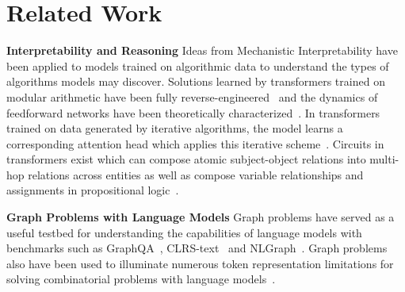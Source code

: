 \section{Related Work}
\vspace{-0.05in}
{\bf Interpretability and Reasoning}
Ideas from Mechanistic Interpretability have been applied to models trained on algorithmic data to understand the types of algorithms models may discover. Solutions learned by transformers trained on modular arithmetic have been fully reverse-engineered~\cite{nanda2023} and the dynamics of feedforward networks have been theoretically characterized~\cite{gromov2023grokking, tian2024, he2024learning}. In transformers trained on data generated by iterative algorithms, the model learns a corresponding attention head which applies this iterative scheme~\cite{cabannes2024}. Circuits in transformers exist which can compose atomic subject-object relations into multi-hop relations across entities \cite{wang2024grokked} as well as compose variable relationships and assignments in propositional logic~\cite{Hong2024}.


{\bf Graph Problems with Language Models}
Graph problems have served as a useful testbed for understanding the capabilities of language models with benchmarks such as GraphQA~\cite{fatemi2024talk}, CLRS-text~\cite{deepmind2024clrstext} and NLGraph~\cite{wang2023can}. Graph problems also have been used to illuminate numerous token representation limitations for solving combinatorial problems with language models~\cite{ying2021, perozzi2024, deepmind2024clrstext, bachmann2024}.

